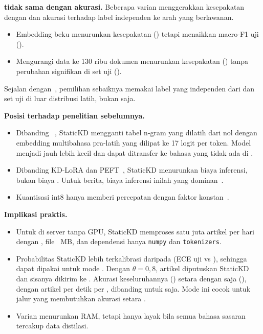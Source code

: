 \textbf{ tidak sama dengan akurasi.} Beberapa varian menggerakkan kesepakatan dengan  dan akurasi terhadap label independen ke arah yang berlawanan.
\begin{itemize}
  \item Embedding beku menurunkan kesepakatan  () tetapi menaikkan macro-F1 uji ().
  \item Mengurangi data ke 130 ribu dokumen menurunkan kesepakatan () tanpa perubahan signifikan di set uji ().
\end{itemize}
Sejalan dengan~\cite{stanton2021kd,ojha2023knowledge}, pemilihan  sebaiknya memakai label yang independen dari  dan set uji di luar distribusi latih, bukan  saja.

\textbf{Posisi terhadap penelitian sebelumnya.}
\begin{itemize}
  \item Dibanding ~\cite{ye2022sparse}, StaticKD mengganti tabel n-gram yang dilatih dari nol dengan embedding multibahasa pra-latih yang dilipat ke 17 logit per token. Model menjadi jauh lebih kecil dan dapat ditransfer ke bahasa yang tidak ada di .
  \item Dibanding KD-LoRA dan PEFT~\cite{azimi2024kdlora,razuvayevskaya2024peft}, StaticKD menurunkan biaya inferensi, bukan biaya . Untuk  berita, biaya inferensi inilah yang dominan~\cite{luccioni2024power}.
  \item Kuantisasi int8  hanya memberi percepatan dengan faktor konstan~\cite{yao2022zeroquant}.
\end{itemize}

\textbf{Implikasi praktis.}
\begin{itemize}
  \item Untuk   di server tanpa GPU, StaticKD memproses satu juta artikel per hari dengan  , file ~MB, dan dependensi hanya \texttt{numpy} dan \texttt{tokenizers}.
  \item Probabilitas StaticKD lebih terkalibrasi daripada  (ECE uji  vs ), sehingga dapat dipakai untuk mode . Dengan $\theta=0{,}8$,  artikel diputuskan StaticKD dan sisanya dikirim ke . Akurasi keseluruhannya () setara dengan  saja (), dengan   artikel per detik per , dibanding  untuk  saja. Mode ini cocok untuk jalur  yang membutuhkan akurasi setara .
  \item Varian  menurunkan RAM, tetapi hanya layak bila semua bahasa sasaran tercakup data distilasi.
\end{itemize}
